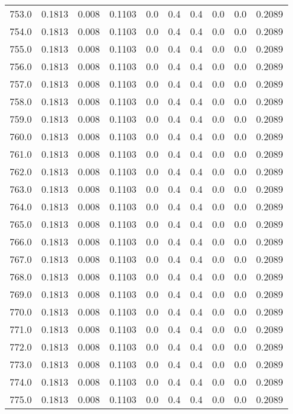 \begin{longtable}{lrrrrrrrrr}
753.0 & 0.1813 & 0.008 & 0.1103 & 0.0 & 0.4 & 0.4 & 0.0 & 0.0 & 0.2089 \\
754.0 & 0.1813 & 0.008 & 0.1103 & 0.0 & 0.4 & 0.4 & 0.0 & 0.0 & 0.2089 \\
755.0 & 0.1813 & 0.008 & 0.1103 & 0.0 & 0.4 & 0.4 & 0.0 & 0.0 & 0.2089 \\
756.0 & 0.1813 & 0.008 & 0.1103 & 0.0 & 0.4 & 0.4 & 0.0 & 0.0 & 0.2089 \\
757.0 & 0.1813 & 0.008 & 0.1103 & 0.0 & 0.4 & 0.4 & 0.0 & 0.0 & 0.2089 \\
758.0 & 0.1813 & 0.008 & 0.1103 & 0.0 & 0.4 & 0.4 & 0.0 & 0.0 & 0.2089 \\
759.0 & 0.1813 & 0.008 & 0.1103 & 0.0 & 0.4 & 0.4 & 0.0 & 0.0 & 0.2089 \\
760.0 & 0.1813 & 0.008 & 0.1103 & 0.0 & 0.4 & 0.4 & 0.0 & 0.0 & 0.2089 \\
761.0 & 0.1813 & 0.008 & 0.1103 & 0.0 & 0.4 & 0.4 & 0.0 & 0.0 & 0.2089 \\
762.0 & 0.1813 & 0.008 & 0.1103 & 0.0 & 0.4 & 0.4 & 0.0 & 0.0 & 0.2089 \\
763.0 & 0.1813 & 0.008 & 0.1103 & 0.0 & 0.4 & 0.4 & 0.0 & 0.0 & 0.2089 \\
764.0 & 0.1813 & 0.008 & 0.1103 & 0.0 & 0.4 & 0.4 & 0.0 & 0.0 & 0.2089 \\
765.0 & 0.1813 & 0.008 & 0.1103 & 0.0 & 0.4 & 0.4 & 0.0 & 0.0 & 0.2089 \\
766.0 & 0.1813 & 0.008 & 0.1103 & 0.0 & 0.4 & 0.4 & 0.0 & 0.0 & 0.2089 \\
767.0 & 0.1813 & 0.008 & 0.1103 & 0.0 & 0.4 & 0.4 & 0.0 & 0.0 & 0.2089 \\
768.0 & 0.1813 & 0.008 & 0.1103 & 0.0 & 0.4 & 0.4 & 0.0 & 0.0 & 0.2089 \\
769.0 & 0.1813 & 0.008 & 0.1103 & 0.0 & 0.4 & 0.4 & 0.0 & 0.0 & 0.2089 \\
770.0 & 0.1813 & 0.008 & 0.1103 & 0.0 & 0.4 & 0.4 & 0.0 & 0.0 & 0.2089 \\
771.0 & 0.1813 & 0.008 & 0.1103 & 0.0 & 0.4 & 0.4 & 0.0 & 0.0 & 0.2089 \\
772.0 & 0.1813 & 0.008 & 0.1103 & 0.0 & 0.4 & 0.4 & 0.0 & 0.0 & 0.2089 \\
773.0 & 0.1813 & 0.008 & 0.1103 & 0.0 & 0.4 & 0.4 & 0.0 & 0.0 & 0.2089 \\
774.0 & 0.1813 & 0.008 & 0.1103 & 0.0 & 0.4 & 0.4 & 0.0 & 0.0 & 0.2089 \\
775.0 & 0.1813 & 0.008 & 0.1103 & 0.0 & 0.4 & 0.4 & 0.0 & 0.0 & 0.2089 \\

\end{longtable}
